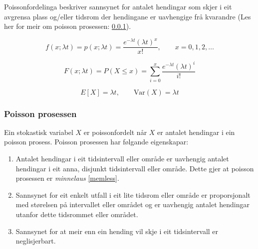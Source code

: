 Poissonfordelinga beskriver sannsynet for antalet hendingar som skjer i eit avgrensa plass og/eller tidsrom der hendingane er uavhengige frå kvarandre (Les her for meir om poisson prosessen: \ref{chap:poissonpro}). 

\begin{equation}
    f(x; \lambda t) = p(x; \lambda t) = \frac{e^{-\lambda t}(\lambda t)^x}{x!}, \qquad x = 0, 1, 2, \dots
\end{equation}

\begin{equation}
    F(x; \lambda t) = P(X \leq x) = \sum_{i = 0}^{x} \frac{e^{-\lambda t}(\lambda t)^i}{i!}
\end{equation}

\begin{equation}
    E[X] = \lambda t, \qquad \text{Var}(X) = \lambda t
\end{equation}

\subsubsection{Poisson prosessen}\label{chap:poissonpro}
Ein stokastisk variabel $X$ er poissonfordelt når $X$ er antalet hendingar i ein poisson prosess. Poisson prosessen har følgande eigenskapar:

\begin{enumerate}
    \item Antalet hendingar i eit tidsintervall eller område er uavhengig antalet hendingar i eit anna, disjunkt tidsintervall eller område. Dette gjer at poisson prosessen er \textit{minnelaus }\ref{memless}.
    \item Sannsynet for eit enkelt utfall i eit lite tidsrom eller område er proporsjonalt med størelsen på intervallet eller området og er uavhengig antalet hendingar utanfor dette tidsrommet eller området.
    \item Sannsynet for at meir enn ein hending vil skje i eit tidsintervall er neglisjerbart.
\end{enumerate}

